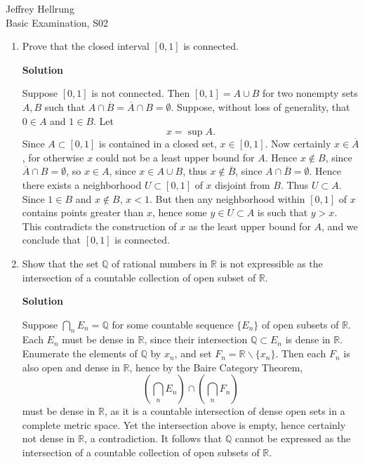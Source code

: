 \documentclass{article}
\begin{document}
\begin{flushright}
Jeffrey Hellrung \\
Basic Examination, S02 \\
\end{flushright}


\begin{enumerate}

\item Prove that the closed interval \([0,1]\) is connected.

{\bf Solution}

Suppose \([0,1]\) is not connected.  Then \([0,1] = A \cup B\) for two nonempty sets \(A,B\) such that \(A \cap \overline{B} = \overline{A} \cap B = \emptyset\).  Suppose, without loss of generality, that \(0 \in A\) and \(1 \in B\).  Let
\[x = \sup A.\]
Since \(A \subset [0,1]\) is contained in a closed set, \(x \in [0,1]\).  Now certainly \(x \in \overline{A}\), for otherwise \(x\) could not be a least upper bound for \(A\).  Hence \(x \notin B\), since \(\overline{A} \cap B = \emptyset\), so \(x \in A\), since \(x \in A \cup B\), thus \(x \notin \overline{B}\), since \(A \cap \overline{B} = \emptyset\).  Hence there exists a neighborhood \(U \subset [0,1]\) of \(x\) disjoint from \(B\).  Thus \(U \subset A\).  Since \(1 \in B\) and \(x \notin B\), \(x < 1\).  But then any neighborhood within \([0,1]\) of \(x\) contains points greater than \(x\), hence some \(y \in U \subset A\) is such that \(y > x\).  This contradicts the construction of \(x\) as the least upper bound for \(A\), and we conclude that \([0,1]\) is connected.



\item Show that the set \(\mathbb{Q}\) of rational numbers in \(\mathbb{R}\) is not expressible as the intersection of a countable collection of open subset of \(\mathbb{R}\).

{\bf Solution}

Suppose \(\bigcap_n E_n = \mathbb{Q}\) for some countable sequence \(\{E_n\}\) of open subsets of \(\mathbb{R}\).  Each \(E_n\) must be dense in \(\mathbb{R}\), since their intersection \(\mathbb{Q} \subset E_n\) is dense in \(\mathbb{R}\).  Enumerate the elements of \(\mathbb{Q}\) by \(x_n\), and set \(F_n = \mathbb{R} \backslash \{x_n\}\).  Then each \(F_n\) is also open and dense in \(\mathbb{R}\), hence by the Baire Category Theorem,
\[\left( \bigcap_n E_n \right) \cap \left( \bigcap_n F_n \right)\]
must be dense in \(\mathbb{R}\), as it is a countable intersection of dense open sets in a complete metric space.  Yet the intersection above is empty, hence certainly not dense in \(\mathbb{R}\), a contradiction.  It follows that \(\mathbb{Q}\) cannot be expressed as the intersection of a countable collection of open subsets of \(\mathbb{R}\).




\end{enumerate}
\end{document}
